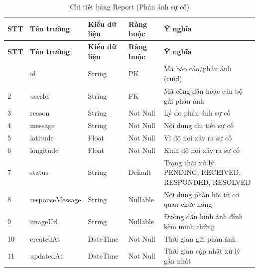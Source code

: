 \begin{longtable}{|p{0.7cm}|p{3.3cm}|p{1.9cm}|p{2.1cm}|p{5.4cm}|}
    \caption{Chi tiết bảng Report (Phản ánh sự cố)}
    \label{tab:db_report} \\
    \hline
    \textbf{STT} & \textbf{Tên trường} & \textbf{Kiểu dữ liệu} & \textbf{Ràng buộc} & \textbf{Ý nghĩa} \\
    \hline
    \endfirsthead
    \hline
    \textbf{STT} & \textbf{Tên trường} & \textbf{Kiểu dữ liệu} & \textbf{Ràng buộc} & \textbf{Ý nghĩa} \\
    \hline
    \endhead
    \hline
    \endfoot
    \hline
    \endlastfoot
    1 & id & String & PK & Mã báo cáo/phản ánh (cuid) \\ \hline
    2 & userId & String & FK & Mã công dân hoặc cán bộ gửi phản ánh \\ \hline
    3 & reason & String & Not Null & Lý do phản ánh sự cố \\ \hline
    4 & message & String & Not Null & Nội dung chi tiết sự cố \\ \hline
    5 & latitude & Float & Not Null & Vĩ độ nơi xảy ra sự cố \\ \hline
    6 & longitude & Float & Not Null & Kinh độ nơi xảy ra sự cố \\ \hline
    7 & status & String & Default & Trạng thái xử lý: PENDING, RECEIVED, RESPONDED, RESOLVED \\ \hline
    8 & responseMessage & String & Nullable & Nội dung phản hồi từ cơ quan chức năng \\ \hline
    9 & imageUrl & String & Nullable & Đường dẫn hình ảnh đính kèm minh chứng \\ \hline
    10 & createdAt & DateTime & Not Null & Thời gian gửi phản ánh \\ \hline
    11 & updatedAt & DateTime & Not Null & Thời gian cập nhật xử lý gần nhất \\
\end{longtable}

